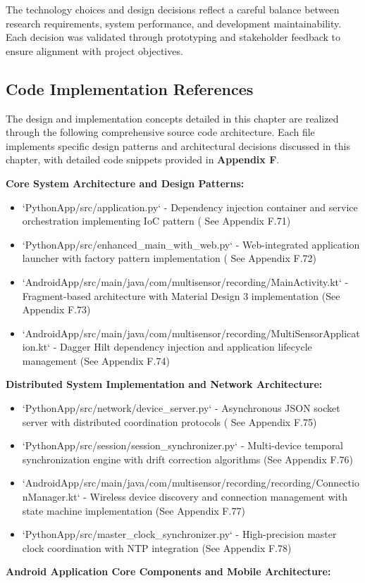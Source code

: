 \documentclass[12pt,a4paper]{article}
\begin{document}
The technology choices and design decisions reflect a careful balance between research requirements, system performance,
and development maintainability. Each decision was validated through prototyping and stakeholder feedback to ensure
alignment with project objectives.

\subsection{Code Implementation References}

The design and implementation concepts detailed in this chapter are realized through the following comprehensive source
code architecture. Each file implements specific design patterns and architectural decisions discussed in this chapter,
with detailed code snippets provided in \textbf{Appendix F}.

\textbf{Core System Architecture and Design Patterns:}

\begin{itemize}
\item `PythonApp/src/application.py` - Dependency injection container and service orchestration implementing IoC pattern (
  See Appendix F.71)
\item `PythonApp/src/enhanced_main_with_web.py` - Web-integrated application launcher with factory pattern implementation (
  See Appendix F.72)
\item `AndroidApp/src/main/java/com/multisensor/recording/MainActivity.kt` - Fragment-based architecture with Material
  Design 3 implementation (See Appendix F.73)
\item `AndroidApp/src/main/java/com/multisensor/recording/MultiSensorApplication.kt` - Dagger Hilt dependency injection and
  application lifecycle management (See Appendix F.74)

\end{itemize}
\textbf{Distributed System Implementation and Network Architecture:}

\begin{itemize}
\item `PythonApp/src/network/device_server.py` - Asynchronous JSON socket server with distributed coordination protocols (
  See Appendix F.75)
\item `PythonApp/src/session/session_synchronizer.py` - Multi-device temporal synchronization engine with drift correction
  algorithms (See Appendix F.76)
\item `AndroidApp/src/main/java/com/multisensor/recording/recording/ConnectionManager.kt` - Wireless device discovery and
  connection management with state machine implementation (See Appendix F.77)
\item `PythonApp/src/master_clock_synchronizer.py` - High-precision master clock coordination with NTP integration (See
  Appendix F.78)

\end{itemize}
\textbf{Android Application Core Components and Mobile Architecture:}
\end{document}
